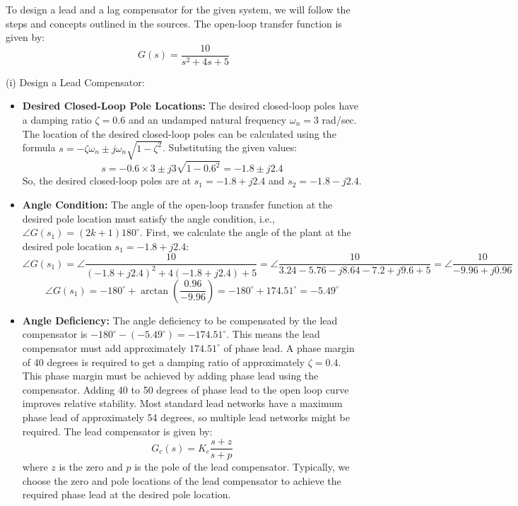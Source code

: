 \begin{mdframed}[linecolor=gray!80!black, backgroundcolor=gray!10!white, linewidth=1pt, roundcorner=5pt, frametitle=Solution]
To design a lead and a lag compensator for the given system, we will follow the steps and concepts outlined in the sources. The open-loop transfer function is given by:
\[
G(s) = \frac{10}{s^2 + 4s + 5}
\]

(i) Design a Lead Compensator:

\begin{itemize}
    \item \textbf{Desired Closed-Loop Pole Locations:} The desired closed-loop poles have a damping ratio \( \zeta = 0.6 \) and an undamped natural frequency \( \omega_n = 3 \) rad/sec. The location of the desired closed-loop poles can be calculated using the formula \( s = -\zeta\omega_n \pm j\omega_n\sqrt{1-\zeta^2} \). Substituting the given values:
    \[
    s = -0.6 \times 3 \pm j3\sqrt{1 - 0.6^2} = -1.8 \pm j2.4
    \]
    So, the desired closed-loop poles are at \(s_1 = -1.8 + j2.4\) and \(s_2 = -1.8 - j2.4\).
    
    \item \textbf{Angle Condition:} The angle of the open-loop transfer function at the desired pole location must satisfy the angle condition, i.e., \(\angle G(s_1) = (2k+1)180^\circ\). First, we calculate the angle of the plant at the desired pole location \(s_1 = -1.8 + j2.4\):
    \[
    \angle G(s_1) = \angle \frac{10}{(-1.8 + j2.4)^2 + 4(-1.8 + j2.4) + 5} = \angle \frac{10}{3.24 - 5.76 - j8.64 - 7.2 + j9.6 + 5}  = \angle \frac{10}{-9.96 + j0.96}
    \]
    \[
    \angle G(s_1) = -180^\circ + \arctan\left(\frac{0.96}{-9.96}\right) = -180^\circ + 174.51^\circ = -5.49^\circ
    \]
    
    \item \textbf{Angle Deficiency:} The angle deficiency to be compensated by the lead compensator is \(-180^\circ - (-5.49^\circ) = -174.51^\circ\). This means the lead compensator must add approximately \(174.51^\circ\) of phase lead. A phase margin of 40 degrees is required to get a damping ratio of approximately \(\zeta = 0.4\). This phase margin must be achieved by adding phase lead using the compensator. Adding 40 to 50 degrees of phase lead to the open loop curve improves relative stability. Most standard lead networks have a maximum phase lead of approximately 54 degrees, so multiple lead networks might be required. The lead compensator is given by:
    \[
    G_c(s) = K_c \frac{s+z}{s+p}
    \]
    where \(z\) is the zero and \(p\) is the pole of the lead compensator. Typically, we choose the zero and pole locations of the lead compensator to achieve the required phase lead at the desired pole location.
    

\end{itemize}
\end{mdframed}
